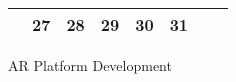 {\begin{tabularx}{\linewidth}{|l!{\vrule width \myLenLineThicknessThick}*{7}{@{}X@{}|}}
       & 
    
      
      
        \begin{minipage}[t]{6mm}\centering{}27\end{minipage}
      
       & 
    
      
      
        \begin{minipage}[t]{6mm}\centering{}28\end{minipage}
      
       & 
    
      
      
        \begin{minipage}[t]{6mm}\centering{}29\end{minipage}
      
       & 
    
      
      
        \begin{minipage}[t]{6mm}\centering{}30\end{minipage}
      
       & 
    
      
      
        \begin{minipage}[t]{6mm}\centering{}31\end{minipage}
      
      
        \\  \hline 
      
    
  
  
  \end{tabularx}
}
\vfill{\centering{} \small{AR Platform Development}\hspace{1.5em}\par}

